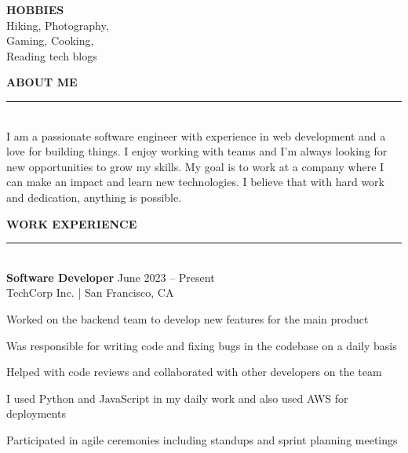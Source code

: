 \documentclass[letterpaper,11pt]{article}
\begin{document}
\begin{minipage}[t]{6.0cm}
\vspace{0.6cm}

{\color{accent}\fontsize{11}{13}\selectfont\bfseries HOBBIES}\\[4pt]
{\color{white}\small
Hiking, Photography,\\[2pt]
Gaming, Cooking,\\[2pt]
Reading tech blogs
}

\vspace{0.5cm}
\end{minipage}%
\hspace{0.3cm}%
\begin{minipage}[t]{12.7cm}
\vspace{0.6cm}

{\color{accent}\fontsize{13}{15}\selectfont\bfseries ABOUT ME}\\[2pt]
{\color{accent}\rule{2cm}{1.5pt}}\\[6pt]
{\color{darktext}\small
I am a passionate software engineer with experience in web development and a love for building things. I enjoy working with teams and I'm always looking for new opportunities to grow my skills. My goal is to work at a company where I can make an impact and learn new technologies. I believe that with hard work and dedication, anything is possible.
}

\vspace{0.5cm}

{\color{accent}\fontsize{13}{15}\selectfont\bfseries WORK EXPERIENCE}\\[2pt]
{\color{accent}\rule{2cm}{1.5pt}}\\[6pt]

{\color{darktext}\bfseries Software Developer} \hfill {\color{medtext}\small June 2023 -- Present}\\
{\color{medtext}\small TechCorp Inc. | San Francisco, CA}\\[4pt]
\begin{itemize}[leftmargin=12pt, itemsep=1pt, parsep=0pt, topsep=0pt]
  {\color{darktext}\small
  \item Worked on the backend team to develop new features for the main product
  \item Was responsible for writing code and fixing bugs in the codebase on a daily basis
  \item Helped with code reviews and collaborated with other developers on the team
  \item I used Python and JavaScript in my daily work and also used AWS for deployments
  \item Participated in agile ceremonies including standups and sprint planning meetings
  }
\end{itemize}


\end{minipage}
\end{document}
